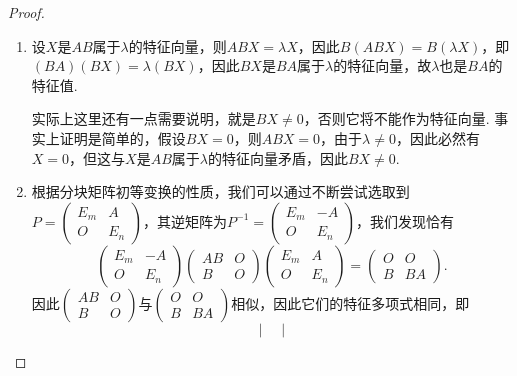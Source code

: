 \begin{proof}
    \begin{enumerate}
        \item 设$X$是$AB$属于$\lambda$的特征向量，则$ABX=\lambda X$，因此$B(ABX)=B(\lambda X)$，即$(BA)(BX)=\lambda(BX)$，因此$BX$是$BA$属于$\lambda$的特征向量，故$\lambda$也是$BA$的特征值.

              实际上这里还有一点需要说明，就是$BX\neq 0$，否则它将不能作为特征向量. 事实上证明是简单的，假设$BX=0$，则$ABX=0$，由于$\lambda\neq 0$，因此必然有$X=0$，但这与$X$是$AB$属于$\lambda$的特征向量矛盾，因此$BX\neq 0$.

        \item 根据分块矩阵初等变换的性质，我们可以通过不断尝试选取到$P=\begin{pmatrix}
                      E_m & A \\ O & E_n
                  \end{pmatrix}$，其逆矩阵为$P^{-1}=\begin{pmatrix}
                      E_m & -A \\ O & E_n
                  \end{pmatrix}$，我们发现恰有
              \[\begin{pmatrix}
                      E_m & -A \\ O & E_n
                  \end{pmatrix}\begin{pmatrix}
                      AB & O \\ B & O
                  \end{pmatrix}\begin{pmatrix}
                      E_m & A \\ O & E_n
                  \end{pmatrix}=\begin{pmatrix}
                      O & O \\ B & BA
                  \end{pmatrix}.\]
              因此$\begin{pmatrix}
                      AB & O \\ B & O
                  \end{pmatrix}$与$\begin{pmatrix}
                      O & O \\ B & BA
                  \end{pmatrix}$相似，因此它们的特征多项式相同，即
              \[\begin{vmatrix}

\end{vmatrix}\]
\end{enumerate}
\end{proof}
